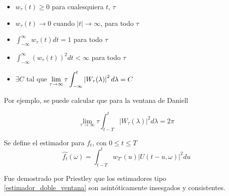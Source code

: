 \begin{itemize}
\item $w_{\tau}(t) \geq 0$ para cualesquiera $t$, $\tau$
\item $w_{\tau}(t) \rightarrow 0$ cuando $\lvert t \lvert \rightarrow \infty$, para todo $\tau$
\item $\displaystyle \int_{-\infty}^{\infty} w_{\tau}(t) dt = 1$ para todo $\tau$
\item $\displaystyle \int_{-\infty}^{\infty} \left( w_{\tau}(t) \right)^{2} dt < \infty$ para todo $\tau$
\item $\exists C$ tal que  
$\displaystyle \lim_{\tau\rightarrow\infty} \tau \int_{-\infty}^{t} \left|  W_{\tau}(\lambda)  \right|^{2} d\lambda = C$
\end{itemize}


%

Por ejemplo, se puede calcular que para la ventana de Daniell

$$\lim_{\tau\rightarrow\infty} \tau \int_{t-T}^{t} \lvert W_{\tau}(\lambda) \lvert^{2} d\lambda = 2\pi$$


Se define el estimador para $f_t$, con $0 \leq t \leq T$
\begin{equation*}
\widehat{f_t}(\omega) = \int_{t-T}^{t} w_{T'}(u) \lvert U(t-u,\omega) \lvert^{2} du
\label{estimador_doble_ventana}
\end{equation*}

Fue demostrado por Priestley \cite{Priestley69} que los estimadores tipo
\ref{estimador_doble_ventana} son asint\'oticamente insesgados y consistentes.

